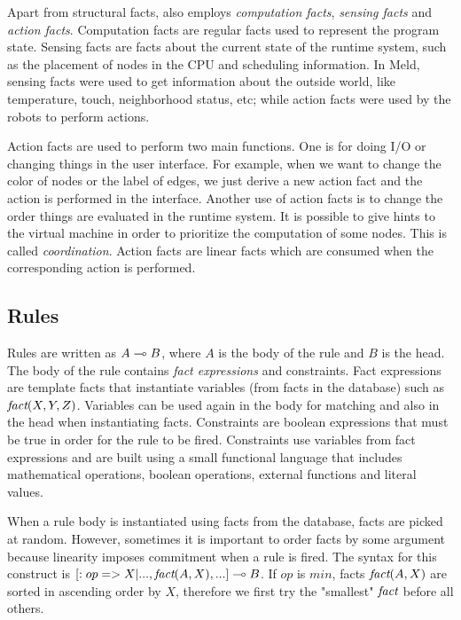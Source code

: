 Apart from structural facts, \lang also employs \emph{computation facts}, \emph{sensing facts}
and \emph{action facts}.
Computation facts are regular facts used to represent the program state.
Sensing facts are facts about the current state of the runtime system, such as the placement
of nodes in the CPU and scheduling information. In Meld, sensing facts
were used to get information about the outside world, like temperature, touch, neighborhood status,
etc; while action facts were used by the robots to perform actions.

Action facts are used to perform two main functions. One is for doing I/O or changing things
in the user interface. For example, when we want to change the color of nodes or the label
of edges, we just derive a new action fact and the action is performed in the interface.
Another use of action facts is to change the order things are evaluated in the runtime system.
It is possible to give hints to the virtual machine in order to prioritize the computation of
some nodes. This is called \emph{coordination}.
Action facts are linear facts which are consumed when the corresponding action is performed.

\subsection{Rules}

Rules are written as $A \multimap B$, where $A$ is the body of the rule and $B$ is the head.
The body of the rule contains \emph{fact expressions} and constraints.
Fact expressions are template facts that instantiate variables (from facts in the database)
such as $\emph{fact}(X, Y, Z)$. Variables can be used again in the body for matching and
also in the head when instantiating facts. Constraints are boolean expressions that must
be true in order for the rule to be fired. Constraints use variables from fact expressions and are built using a small functional language that includes mathematical operations, boolean operations, external functions and literal values.

When a rule body is instantiated using facts from the database, facts are picked at random. However,
sometimes it is important to order facts by some argument because linearity imposes commitment when a rule is fired. The syntax for this construct is $[:op => X | ..., \emph{fact}(A, X), ...] \multimap B$. If $op$ is $min$, facts $\emph{fact}(A, X)$ are sorted in ascending order by $X$, therefore we first try the "smallest" $\emph{fact}$ before all others.

